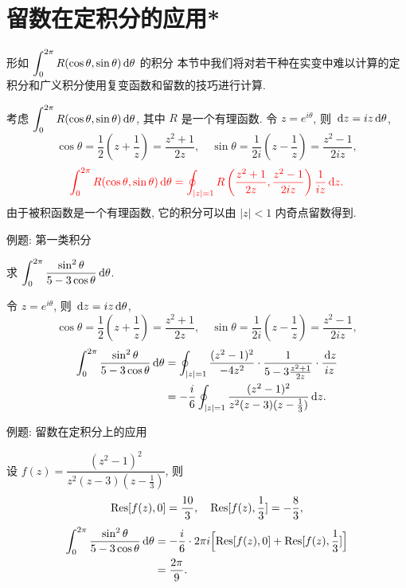 \section{留数在定积分的应用*}


\begin{frame}{形如 $\displaystyle\int_0^{2\pi} R(\cos\theta,\sin\theta)\,\mathrm{d}\theta$ 的积分}
\onslide<+->
本节中我们将对若干种在实变中难以计算的定积分和广义积分使用复变函数和留数的技巧进行计算.

\onslide<+->
考虑 $\displaystyle\int_0^{2\pi} R(\cos\theta,\sin\theta)\,\mathrm{d}\theta$, 其中 $R$ 是一个有理函数.
\onslide<+->
令 $z=e^{i\theta}$, 则 $\,\mathrm{d} z=iz\,\mathrm{d}\theta$,
\onslide<+->
\[\cos\theta=\frac12\left(z+\frac1z\right)=\frac{z^2+1}{2z},\quad
\sin\theta=\frac1{2i}\left(z-\frac1z\right)=\frac{z^2-1}{2iz},\]
\onslide<+->
\[{\color{red}{\int_0^{2\pi} R(\cos\theta,\sin\theta)\,\mathrm{d}\theta=\oint_{|z|=1}R\left(\frac{z^2+1}{2z},\frac{z^2-1}{2iz}\right)\frac1{iz}\,\mathrm{d}z.}}\]
\onslide<+->
由于被积函数是一个有理函数, 它的积分可以由 $|z|<1$ 内奇点留数得到.
\end{frame}


\begin{frame}{例题: 第一类积分}
\begin{example}
求 $\displaystyle\int_0^{2\pi}\frac{\sin^2\theta}{5-3\cos\theta}\,\mathrm{d}\theta$.
\end{example}

\begin{solution}
令 $z=e^{i\theta}$, 则 $\,\mathrm{d} z=iz\,\mathrm{d}\theta$,
\onslide<+->
\[\cos\theta=\frac12\left(z+\frac1z\right)=\frac{z^2+1}{2z},\quad
\sin\theta=\frac1{2i}\left(z-\frac1z\right)=\frac{z^2-1}{2iz},\]
\vspace{-0.5\baselineskip}
\onslide<+->
\begin{align*}
\int_0^{2\pi}\frac{\sin^2\theta}{5-3\cos\theta}\,\mathrm{d}\theta
&=\oint_{|z|=1}\frac{(z^2-1)^2}{-4z^2}\cdot\frac1{5-3\frac{z^2+1}{2z}}\cdot\frac{\,\mathrm{d} z}{iz}\\
&=-\frac i6\oint_{|z|=1}\frac{(z^2-1)^2}{z^2(z-3)(z-\frac13)}\,\mathrm{d} z.
\end{align*}
\end{solution}
\end{frame}


\begin{frame}{例题: 留数在定积分上的应用}
\begin{solution}
设 $f(z)=\dfrac{(z^2-1)^2}{z^2(z-3)(z-\frac13)}$,
\onslide<+->
则
\[{\mathrm{Res}}[f(z),0]=\frac{10}3,\quad
{\mathrm{Res}}[f(z),\frac13]=-\frac83,\]
\onslide<+->
\begin{align*}
\int_0^{2\pi}\frac{\sin^2\theta}{5-3\cos\theta}\,\mathrm{d}\theta
&=-\frac i6\cdot 2\pi i\Bigl[{\mathrm{Res}}[f(z),0]+{\mathrm{Res}}[f(z),\frac13]\Bigr]\\
&=\frac{2\pi}9.
\end{align*}
\end{solution}
\end{frame}


